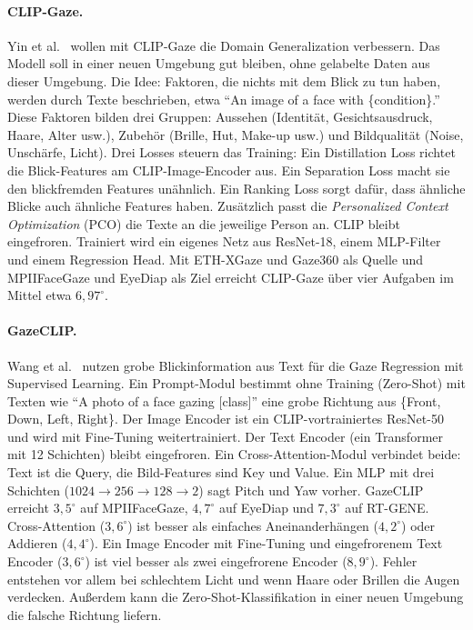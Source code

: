 \paragraph{CLIP-Gaze.}
Yin et al.~\cite{yin2024clipgaze} wollen mit CLIP-Gaze die
Domain Generalization verbessern. Das Modell soll in einer neuen Umgebung gut
bleiben, ohne gelabelte Daten aus dieser Umgebung. Die Idee: Faktoren, die
nichts mit dem Blick zu tun haben, werden durch Texte beschrieben, etwa
\enquote{An image of a face with \{condition\}.} Diese Faktoren bilden drei
Gruppen: Aussehen (Identität, Gesichtsausdruck, Haare, Alter usw.), Zubehör
(Brille, Hut, Make-up usw.) und Bildqualität (Noise, Unschärfe, Licht).
Drei Losses steuern das Training: Ein Distillation Loss richtet die
Blick-Features am CLIP-Image-Encoder aus. Ein Separation Loss macht sie den
blickfremden Features unähnlich. Ein Ranking Loss sorgt dafür, dass ähnliche
Blicke auch ähnliche Features haben. Zusätzlich passt die \emph{Personalized
Context Optimization} (PCO) die Texte an die jeweilige Person an. CLIP bleibt
eingefroren. Trainiert wird ein eigenes Netz aus ResNet-18, einem MLP-Filter
und einem Regression Head. Mit ETH-XGaze und Gaze360 als Quelle und
MPIIFaceGaze und EyeDiap als Ziel erreicht CLIP-Gaze über vier Aufgaben im
Mittel etwa $6,97^\circ$.

\paragraph{GazeCLIP.}
Wang et al.~\cite{wang2026gazeclip} nutzen grobe Blickinformation aus Text
für die Gaze Regression mit Supervised Learning. Ein Prompt-Modul bestimmt ohne Training
(Zero-Shot) mit Texten wie \enquote{A photo of a face gazing [class]} eine
grobe Richtung aus \{Front, Down, Left, Right\}. Der Image Encoder ist ein
CLIP-vortrainiertes ResNet-50 und wird mit Fine-Tuning weitertrainiert. Der Text Encoder (ein
Transformer mit 12 Schichten) bleibt eingefroren. Ein Cross-Attention-Modul
verbindet beide: Text ist die Query, die Bild-Features sind Key und Value. Ein
MLP mit drei Schichten ($1024 \rightarrow 256 \rightarrow 128 \rightarrow 2$)
sagt Pitch und Yaw vorher. GazeCLIP erreicht $3,5^\circ$ auf MPIIFaceGaze,
$4,7^\circ$ auf EyeDiap und $7,3^\circ$ auf RT-GENE. Cross-Attention
($3,6^\circ$) ist besser als einfaches Aneinanderhängen ($4,2^\circ$) oder
Addieren ($4,4^\circ$). Ein Image Encoder mit Fine-Tuning und eingefrorenem
Text Encoder ($3,6^\circ$) ist viel besser als zwei eingefrorene Encoder
($8,9^\circ$). Fehler entstehen vor allem bei schlechtem Licht und wenn Haare
oder Brillen die Augen verdecken. Außerdem kann die Zero-Shot-Klassifikation in
einer neuen Umgebung die falsche Richtung liefern.

